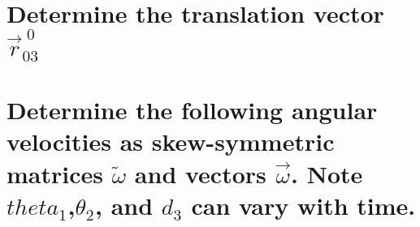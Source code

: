 \documentclass[12pt,letterpaper, onecolumn]{exam}
\begin{document}
\begin{questions}
\begin{parts}
        \part{Determine the translation vector $\vec{r}^{\;0}_{03}$}

        \part{Determine the following angular velocities as skew-symmetric matrices $\tilde{\omega}$ and vectors $\vec{\omega}$. Note $theta_1$,$\theta_2$, and $d_3$ can vary with time.}
        \begin{subparts}



        \end{subparts}

    \end{parts}
    \clearpage
    \question{}
    \begin{parts}
        \part{}

        \part{}

    \end{parts}
    \clearpage
    \question{}
    \begin{parts}
        \part{}

        \part{}

        \part{}

        \part{}


\end{parts}
\end{questions}
\end{document}
